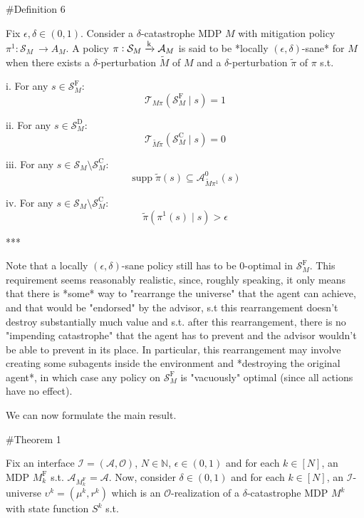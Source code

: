 \documentclass[a4paper]{article}
\newcommand{\Comment}[1]{}
\DeclareMathOperator{\Supp}{supp}
\newcommand{\AP}[1]{\left(#1\right)}
\newcommand{\Nats}{\mathbb{N}}
\newcommand{\M}{\xrightarrow{\textnormal{k}}}
\newcommand{\Ob}{\mathcal{O}}
\newcommand{\A}{\mathcal{A}}
\newcommand{\St}{\mathcal{S}}
\newcommand{\T}{\mathcal{T}}
\newcommand{\In}{\mathcal{I}}
\newcommand{\SF}{\St^{\text{F}}}
\newcommand{\SD}{\St^{\text{D}}}
\newcommand{\SC}{\St^{\text{C}}}
\newcommand{\MF}{M^{\text{F}}}
\begin{document}
\#Definition 6

Fix $\epsilon,\delta \in (0,1)$. Consider a $\delta$-catastrophe MDP $M$ with mitigation policy $\pi^1: \St_M\ \rightarrow A_M$. A policy $\pi: \St_M \M \A_M$ is said to be *locally $(\epsilon,\delta)$-sane* for $M$ when there exists a $\delta$-perturbation $\tilde{M}$ of $M$ and a $\delta$-perturbation $\tilde{\pi}$ of $\pi$ s.t.

i. For any $s \in \SF_M$: $$\T_{M\pi}\AP{\SF_M \mid s} = 1$$

ii. For any $s \in \SD_M$: $$\T_{\tilde{M}\tilde{\pi}}\AP{\SC_M \mid s} = 0$$

iii. For any $s \in \St_M \setminus \SC_M$: $$\Supp{\tilde{\pi}(s)} \subseteq \A_{\tilde{M}\pi^1}^0(s)$$

iv. For any $s \in \St_M \setminus \SC_M$: $$\tilde{\pi}\AP{\pi^1(s) \mid s} > \epsilon$$

\Comment{For $M$ an arbitrary MDP, $s_0 \in \St_M$ and $\tau_1,\tau_2 \in (0,\infty)$, we say $\pi$ is *locally $(\epsilon,\delta)$-sane for $\AP{M,s_0}$ with moments $\tau_1,\tau_2$* when *either* $\pi$ is locally $\epsilon$-sane for $\AP{M,s_0}$ *or* there is *some* way to view $M$ as a $\delta$-catastrophe MDP with $s_0 \in \SD_M$ such that the corresponding mitigation policy $\pi^1$ has moments $\tau_1,\tau_2$ at $s_0$ and $\pi$ is locally $(\epsilon,\delta)$-sane for $M$ in the corresponding sense.}

***

Note that a locally $(\epsilon,\delta)$-sane policy still has to be $0$-optimal in $\SF_M$. This requirement seems reasonably realistic, since, roughly speaking, it only means that there is *some* way to "rearrange the universe" that the agent can achieve, and that would be "endorsed" by the advisor, s.t this rearrangement doesn't destroy substantially much value and s.t. after this rearrangement, there is no "impending catastrophe" that the agent has to prevent and the advisor wouldn't be able to prevent in its place. In particular, this rearrangement may involve creating some subagents inside the environment and *destroying the original agent*, in which case any policy on $\SF_M$ is "vacuously" optimal (since all actions have no effect).

We can now formulate the main result.

\#Theorem 1

Fix an interface $\In=(\A,\Ob)$, $N \in \Nats$, $\epsilon \in (0,1)$ and for each $k \in [N]$, an MDP $\MF_k$ s.t. $\A_{\MF_k} = \A$. Now, consider $\delta\in(0,1)$ and for each $k \in [N]$, an $\In$-universe $\upsilon^k=(\mu^k,r^k)$ which is an $\Ob$-realization of a $\delta$-catastrophe MDP $M^k$ with state function $S^k$ s.t.
\end{document}
